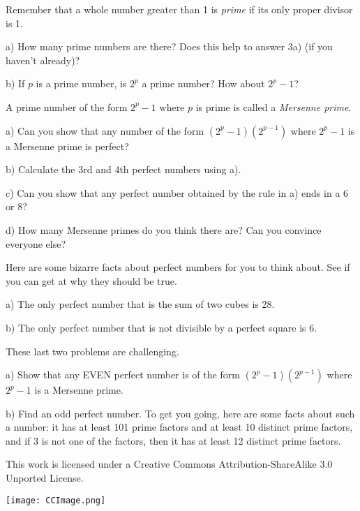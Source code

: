 \documentclass[12pt]{article}
\newcommand{\numb}[1]{\noindent{\bf #1)}}
\begin{document}
\numb{4} Remember that a whole number greater than 1 is \textit{prime} if its only proper divisor is 1. 

\bigskip

a) How many prime numbers are there? Does this help to answer 3a) (if you haven't already)?

\bigskip

b) If $p$ is a prime number, is $2^p$ a prime number? How about $2^p-1$?

\newpage

\numb{5} A prime number of the form $2^p-1$ where $p$ is prime is called a \textit{Mersenne prime}.

\bigskip

a) Can you show that any number of the form $(2^p-1)(2^{p-1})$ where $2^p-1$ is a Mersenne prime is perfect?

\bigskip

b) Calculate the 3rd and 4th perfect numbers using a).

\bigskip

c) Can you show that any perfect number obtained by the rule in a) ends in a 6 or 8?

\bigskip

d) How many Mersenne primes do you think there are? Can you convince everyone else?

\newpage

\numb{6} Here are some bizarre facts about perfect numbers for you to think about. See if you can get at why they should be true. 

\bigskip

a) The only perfect number that is the sum of two cubes is 28.

\bigskip

b) The only perfect number that is not divisible by a perfect square is 6. 


\newpage

\numb{7} These last two problems are challenging.

\bigskip

a) Show that any EVEN perfect number is of the form $(2^p-1)(2^{p-1})$ where $2^p-1$ is a Mersenne prime.

\bigskip

b) Find an odd perfect number. To get you going, here are some facts about such a number: it has at least 101 prime factors and at least 10 distinct prime factors, and if 3 is not one of the factors, then it has at least 12 distinct prime factors. 





\newpage

\begin{mdframed}[outerlinecolor=black,outerlinewidth=2pt,linecolor=cccolor,middlelinewidth=3pt,roundcorner=10pt]
  This work is licensed under a Creative Commons Attribution-ShareAlike 3.0 Unported License.
  \begin{center}
    \texttt{[image: CCImage.png]}
  \end{center}
\end{mdframed}



\bigskip
\end{document}
